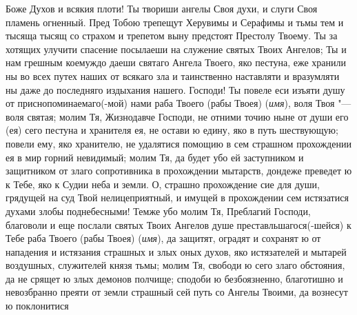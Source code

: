 \begin{mymulticols}
 


Боже Духов и всякия плоти! Ты твориши ангелы Своя духи, и слуги Своя пламень огненный. Пред Тобою трепещут Херувимы и Серафимы и тьмы тем и тысяща тысящ со страхом и трепетом выну предстоят Престолу Твоему. Ты за хотящих улучити спасение посылаеши на служение святых Твоих Ангелов; Ты и нам грешным коемуждо даеши святаго Ангела Твоего, яко пестуна, еже хранили ны во всех путех наших от всякаго зла и таинственно наставляти и вразумляти ны даже до последняго издыхания нашего. Господи! Ты повеле еси изъяти душу от приснопоминаемаго(-мой) нами раба Твоего (рабы Твоея) ({\itshape имя}), воля Твоя "--- воля святая; молим Тя, Жизнодавче Господи, не отними точию ныне от души его (ея) сего пестуна и хранителя ея, не остави ю едину, яко в путь шествующую; повели ему, яко хранителю, не удалятися помощию в сем страшном прохождении ея в мир горний невидимый; молим Тя, да будет убо ей заступником и защитником от злаго сопротивника в прохождении мытарств, дондеже преведет ю к Тебе, яко к Судии неба и земли. О, страшно прохождение сие для души, грядущей на суд Твой нелицеприятный, и имущей в прохождении сем истязатися духами злобы поднебесными! Темже убо молим Тя, Преблагий Господи, благоволи и еще послали святых Твоих Ангелов душе преставльшагося(-шейся) к Тебе раба Твоего (рабы Твоея) ({\itshape имя}), да защитят, оградят и сохранят ю от нападения и истязания страшных и злых оных духов, яко истязателей и мытарей воздушных, служителей князя тьмы; молим Тя, свободи ю сего злаго обстояния, да не срящет ю злых демонов полчище; сподоби ю безбоязненно, благотишно и невозбранно преяти от земли страшный сей путь со Ангелы Твоими, да вознесут ю поклонитися 

\end{mymulticols}

\mychapterending


